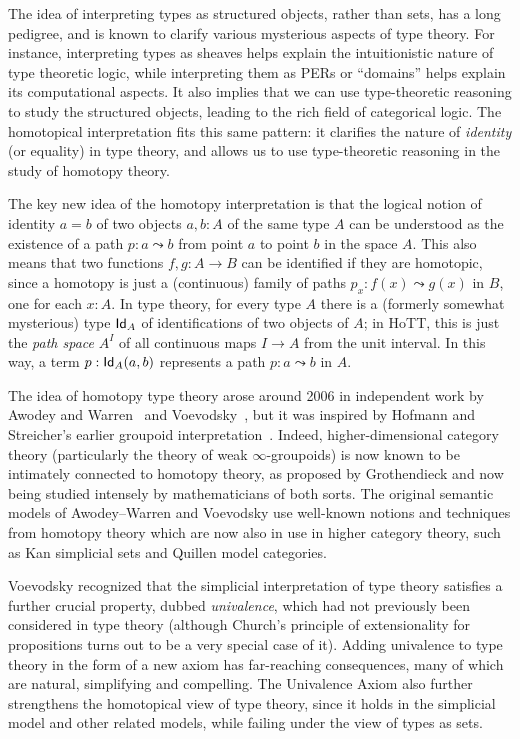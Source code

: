 The idea of interpreting types as structured objects, rather than sets, has a long pedigree, and is known to clarify various mysterious aspects of type theory.
For instance, interpreting types as sheaves helps explain the intuitionistic nature of type theoretic logic, while interpreting them as PERs or ``domains'' helps explain its computational aspects.
It also implies that we can use type-theoretic reasoning to study the structured objects, leading to the rich field of categorical logic.
The homotopical interpretation fits this same pattern: it clarifies the nature of \emph{identity} (or equality) in type theory, and allows us to use type-theoretic reasoning in the study of homotopy theory.

The key new idea of the homotopy interpretation is that the logical notion of identity $a = b$ of two objects $a, b: A$ of the same type $A$ can be understood as the existence of a path $p : a \leadsto b$ from point $a$ to point $b$ in the space $A$.
This also means that two functions $f, g: A\to B$ can be identified if they are homotopic, since a homotopy is just a (continuous) family of paths $p_x: f(x) \leadsto g(x)$ in $B$, one for each $x:A$.
In type theory, for every type $A$ there is a (formerly somewhat mysterious) type $\idtypevar{A}$ of identifications of two objects of $A$; in HoTT, this is just the \emph{path space} $A^I$ of all continuous maps $I\to A$ from the unit interval.
In this way, a term $p : \idtype[A]{a}{b}$ represents a path $p : a \leadsto b$ in $A$. 

The idea of homotopy type theory arose around 2006 in independent work by Awodey and Warren~\cite{AW} and Voevodsky~\cite{VV}, but it was inspired by 
Hofmann and Streicher's earlier groupoid interpretation~\cite{HofmannM:gromtt}.
Indeed, higher-dimensional category theory (particularly the theory of weak $\infty$-groupoids) is now known to be intimately connected to homotopy theory, as proposed by Grothendieck and now being studied intensely by mathematicians of both sorts.
The original semantic models of Awodey--Warren and Voevodsky use well-known notions and techniques from homotopy theory which are now also in use in higher category theory, such as Kan simplicial sets and Quillen model categories.

Voevodsky recognized that the simplicial interpretation of type theory satisfies a further crucial property, dubbed \emph{univalence}, which had not previously been considered in type theory (although Church's principle of extensionality for propositions turns out to be a very special case of it).
Adding univalence to type theory in the form of a new axiom has far-reaching consequences, many of which are natural, simplifying and compelling.
The Univalence Axiom also further strengthens the homotopical view of type theory, since it holds in the simplicial model and other related models, while failing under the view of types as sets.

